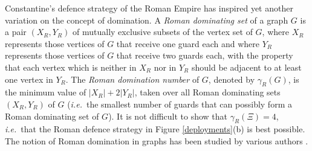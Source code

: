 \documentclass[10pt,a4paper]{article}
\begin{document}
Constantine's defence strategy of the Roman Empire has inspired yet another variation on the concept of domination.  A {\em Roman dominating set} of a graph $G$ is a pair $(X_R,Y_R)$ of mutually exclusive subsets of the vertex set of $G$, where $X_R$ represents those vertices of $G$ that receive one guard each and where $Y_R$ represents those vertices of $G$ that receive two guards each, with the property that each vertex which is neither in $X_R$ nor in $Y_R$ should be adjacent to at least one vertex in $Y_R$. The {\em Roman domination number} of $G$, denoted by $\gamma_R(G)$, is the minimum value of $|X_R|+2|Y_R|$, taken over all Roman dominating sets $(X_R,Y_R)$ of $G$ ({\em i.e.}\ the smallest number of guards that can possibly form a Roman dominating set of $G$).  It is not difficult to show that $\gamma_R(\Xi)=4$, {\em i.e.}\ that the Roman defence strategy in Figure \ref{deployments}(b) is best possible.  The notion of Roman domination in graphs has been studied by various authors \cite{cockayne2,
cockayne1,revelle,stewart}.
 
\end{document}
